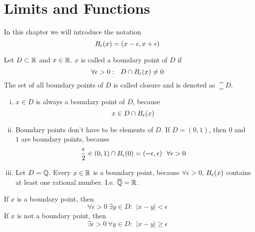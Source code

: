 \documentclass[../script.tex]{subfiles}
\begin{document}
\section{Limits and Functions}

In this chapter we will introduce the notation
\[
    B_{\epsilon}(x) = (x - \epsilon, x + \epsilon)
\]

\begin{defi}
    Let $D \subset \mathbb{R}$ and $x \in \mathbb{R}$. $x$ is called a boundary point of $D$ if 
    \[
        \forall \epsilon > 0: ~~D \cap B_{\epsilon}(x) \ne 0
    \]
    The set of all boundary points of $D$ is called closure and is denoted as $\closure{D}$.
\end{defi}

\begin{eg}
    \begin{enumerate}[(i)]
        \item $x \in D$ is always a boundary point of $D$, because 
        \[
            x \in D \cap B_{\epsilon}(x)
        \]

        \item Boundary points don't have to be elements of $D$. If $D = (0, 1)$, then $0$ and $1$ are boundary points, because 
        \[
            \frac{\epsilon}{2} \in (0, 1) \cap B_{\epsilon}(0) = (-\epsilon, \epsilon) ~~\forall \epsilon > 0
        \]

        \item Let $D = \mathbb{Q}$. Every $x \in \mathbb{R}$ is a boundary point, because $\forall \epsilon > 0$, $B_{\epsilon}(x)$ contains at least one rational number. I.e. $\overline{\mathbb{Q}} = \mathbb{R}$.
    \end{enumerate}
\end{eg}

\begin{rem}
    If $x$ is a boundary point, then 
    \[
        \forall \epsilon > 0 ~\exists y \in D: ~~|x - y| < \epsilon 
    \]
    If $x$ is not a boundary point, then 
    \[
        \exists \epsilon > 0 ~\forall y \in D: ~~|x - y| \ge \epsilon 
    \]
\end{rem}
\end{document}
